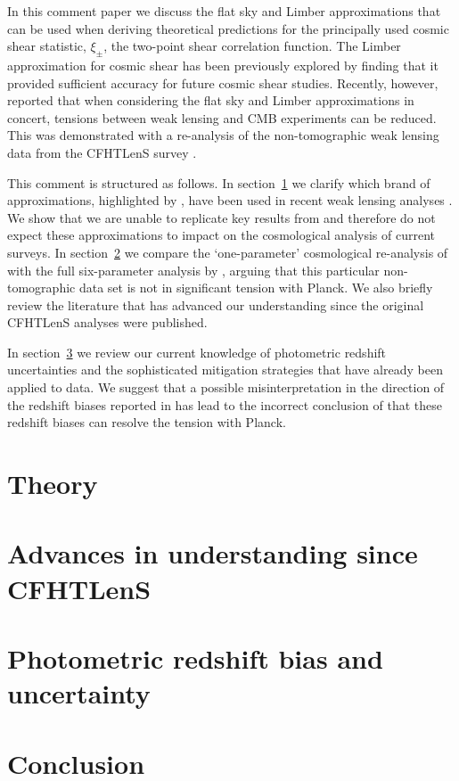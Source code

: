 \documentclass[preprint]{aastex}
\begin{document}
In this comment paper we discuss the flat sky and Limber approximations that can be used when deriving theoretical predictions for the principally used cosmic shear statistic, $\xi_\pm$, the two-point shear correlation function. The Limber approximation for cosmic shear has been previously explored by \citet{giannantonio/etal:2012} finding that it provided sufficient accuracy for future cosmic shear studies. Recently, however, \citet{kitching/etal:2016} reported that when considering the flat sky and Limber approximations in concert, tensions between weak lensing and CMB experiments can be reduced. This was demonstrated with a re-analysis of the non-tomographic weak lensing data from the CFHTLenS survey \citep{kilbinger/etal:2013}.    

This comment is structured as follows.  In section~\ref{sec:theory} we clarify which brand of approximations, highlighted by \citet{kitching/etal:2016}, have been used in recent weak lensing analyses \citep{joudaki/etal:2016, hildebrandt/etal:2016, joudaki/etal:2017}.  We show that we are unable to replicate key results from \citet{kitching/etal:2016} and therefore do not expect these approximations to impact on the cosmological analysis of current surveys. In section~\ref{sec:cfhtlens} we compare the `one-parameter' cosmological re-analysis of \citet{kitching/etal:2016} with the full six-parameter analysis by \citet{kilbinger/etal:2013}, arguing that this particular non-tomographic data set is not in significant tension with Planck.  We also briefly review the literature that has advanced our understanding since the original CFHTLenS analyses were published.   

In section~\ref{sec:photoz} we review our current knowledge of photometric redshift uncertainties and the sophisticated mitigation strategies that have already been applied to data.  We suggest that a possible misinterpretation in the direction of the redshift biases reported in \citet{choi/etal:2016} has lead to the incorrect conclusion of \citet{kitching/etal:2016} that these redshift biases can resolve the tension with Planck.  

\section{Theory}
\label{sec:theory}


\section{Advances in understanding since CFHTLenS}
\label{sec:cfhtlens}


\section{Photometric redshift bias and uncertainty}
\label{sec:photoz}


\section{Conclusion}
\label{sec:conclusion}




\end{document}
